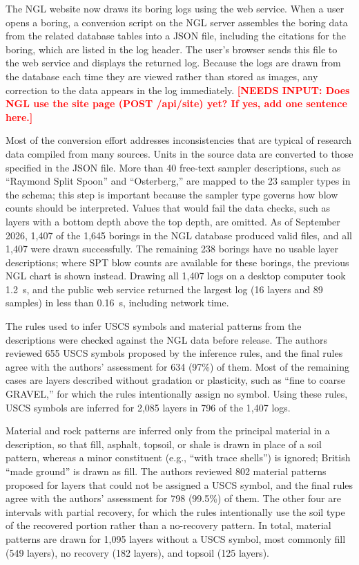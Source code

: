 \documentclass[Journal,letterpaper,InsideFigs]{ascelike-new}
\newcommand{\needsinput}[1]{\textcolor{red}{\textbf{[NEEDS INPUT: #1]}}}
\begin{document}
The NGL website now draws its boring logs using the web service. When a user opens a boring, a conversion script on the NGL server assembles the boring data from the related database tables into a JSON file, including the citations for the boring, which are listed in the log header. The user's browser sends this file to the web service and displays the returned log. Because the logs are drawn from the database each time they are viewed rather than stored as images, any correction to the data appears in the log immediately. \needsinput{Does NGL use the site page (POST /api/site) yet? If yes, add one sentence here.}

Most of the conversion effort addresses inconsistencies that are typical of research data compiled from many sources. Units in the source data are converted to those specified in the JSON file. More than 40 free-text sampler descriptions, such as ``Raymond Split Spoon'' and ``Osterberg,'' are mapped to the 23 sampler types in the schema; this step is important because the sampler type governs how blow counts should be interpreted. Values that would fail the data checks, such as layers with a bottom depth above the top depth, are omitted. As of September 2026, 1,407 of the 1,645 borings in the NGL database produced valid files, and all 1,407 were drawn successfully. The remaining 238 borings have no usable layer descriptions; where SPT blow counts are available for these borings, the previous NGL chart is shown instead. Drawing all 1,407 logs on a desktop computer took 1.2~s, and the public web service returned the largest log (16 layers and 89 samples) in less than 0.16~s, including network time.

The rules used to infer USCS symbols and material patterns from the descriptions were checked against the NGL data before release. The authors reviewed 655 USCS symbols proposed by the inference rules, and the final rules agree with the authors' assessment for 634 (97\%) of them. Most of the remaining cases are layers described without gradation or plasticity, such as ``fine to coarse GRAVEL,'' for which the rules intentionally assign no symbol. Using these rules, USCS symbols are inferred for 2,085 layers in 796 of the 1,407 logs.

Material and rock patterns are inferred only from the principal material in a description, so that fill, asphalt, topsoil, or shale is drawn in place of a soil pattern, whereas a minor constituent (e.g., ``with trace shells'') is ignored; British ``made ground'' is drawn as fill. The authors reviewed 802 material patterns proposed for layers that could not be assigned a USCS symbol, and the final rules agree with the authors' assessment for 798 (99.5\%) of them. The other four are intervals with partial recovery, for which the rules intentionally use the soil type of the recovered portion rather than a no-recovery pattern. In total, material patterns are drawn for 1,095 layers without a USCS symbol, most commonly fill (549 layers), no recovery (182 layers), and topsoil (125 layers).
\end{document}

